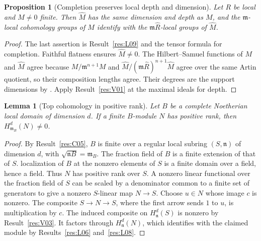 \documentclass[11pt,oneside,openany]{book}
\newtheorem{lemma}[theorem]{Lemma}
\newtheorem{proposition}[theorem]{Proposition}
\theoremstyle{definition}
\theoremstyle{remark}
\begin{document}
\begin{proposition}[Completion preserves local depth and dimension]\label{res:V04}
Let \(R\) be local and \(M\ne0\) finite. Then \(\widehat M\) has
the same dimension and depth as \(M\), and the \(\mathfrak m\)-local
cohomology groups of \(M\) identify with the
\(\mathfrak m\widehat R\)-local groups of \(\widehat M\).
\end{proposition}
\begin{proof}
The last assertion is Result~\ref{res:L09} and the tensor formula for
completion. Faithful flatness ensures \(\widehat M\ne0\).
The Hilbert--Samuel functions of \(M\) and \(\widehat M\) agree
because \(M/\mathfrak m^{n+1}M\) and
\(\widehat M/(\mathfrak m\widehat R)^{n+1}\widehat M\) agree over
the same Artin quotient, so their composition lengths agree.
Their degrees are the support dimensions by
\cite[ALG-05-C03-S02, ALG-05-C04-R03 and S01]{p103}.
Apply Result~\ref{res:V01} at the maximal ideals for depth.
\end{proof}

\begin{lemma}[Top cohomology in positive rank]\label{res:V05}
Let \(B\) be a complete Noetherian local domain of dimension \(d\).
If a finite \(B\)-module \(N\) has positive rank, then
\(H^d_{\mathfrak m_B}(N)\ne0\).
\end{lemma}
\begin{proof}
By Result~\ref{res:C05}, \(B\) is finite over a regular local
subring \((S,\mathfrak n)\) of dimension \(d\), with
\(\sqrt{\mathfrak nB}=\mathfrak m_B\).
The fraction field of \(B\) is a finite extension of that of \(S\).
localization of \(B\) at the nonzero elements of \(S\) is a finite domain
over a field, hence a field. Thus \(N\) has positive rank over \(S\).
A nonzero linear functional over the fraction field of \(S\) can be
scaled by a denominator common to a finite set of generators to give
a nonzero \(S\)-linear map \(N\to S\). Choose \(u\in N\) whose image
\(c\) is nonzero. The composite \(S\to N\to S\), where the first
arrow sends \(1\) to \(u\), is multiplication by \(c\).
The induced composite on \(H^d_{\mathfrak n}(S)\) is nonzero by
Result~\ref{res:V03}. It factors through \(H^d_{\mathfrak n}(N)\),
which identifies with the claimed module by Results~\ref{res:L06}
and~\ref{res:L08}.
\end{proof}
\end{document}
